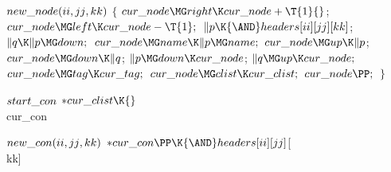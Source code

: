 \B\D$\\{new\_node}(\\{ii},\\{jj},\\{kk})$ \6
${}\{{}$\1\6
${}\\{cur\_node}\MG\\{right}\K\\{cur\_node}+\T{1}{}$;\5
${}\\{cur\_node}\MG\\{left}\K\\{cur\_node}-\T{1};{}$\6
${}\|p\K{\AND}\\{headers}[\\{ii}][\\{jj}][\\{kk}]{}$;\5
${}\|q\K\|p\MG\\{down};{}$\6
${}\\{cur\_node}\MG\\{name}\K\|p\MG\\{name};{}$\6
${}\\{cur\_node}\MG\\{up}\K\|p{}$;\5
${}\\{cur\_node}\MG\\{down}\K\|q{}$;\5
${}\|p\MG\\{down}\K\\{cur\_node}{}$;\5
${}\|q\MG\\{up}\K\\{cur\_node};{}$\6
${}\\{cur\_node}\MG\\{tag}\K\\{cur\_tag};{}$\6
${}\\{cur\_node}\MG\\{clist}\K\\{cur\_clist};{}$\6
${}\\{cur\_node}\PP;{}$\6
\4${}\}{}$\2\par
\B\4\D$\\{start\_con}$ \5
${*}\\{cur\_clist}\K{}$\\{cur\_con}\par
\B\4\D$\\{new\_con}(\\{ii},\\{jj},\\{kk})$ \5
${*}\\{cur\_con}\PP\K{\AND}\\{headers}[\\{ii}][\\{jj}]{}$[\\{kk}]\par
